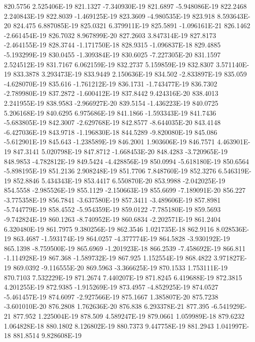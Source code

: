 820.5756  2.525406E-19
821.1327  -7.340930E-19
821.6897  -5.948086E-19
822.2468  2.240843E-19
822.8039  -1.469125E-19
823.3609  -4.980535E-19
823.918  8.593643E-20
824.475  6.887085E-19
825.0321  6.379911E-19
825.5891  -1.096161E-21
826.1462  -2.661454E-19
826.7032  8.967899E-20
827.2603  3.847314E-19
827.8173  -2.464155E-19
828.3744  -1.171750E-18
828.9315  -1.096837E-18
829.4885  -5.193299E-19
830.0455  -1.309384E-19
830.6025  -7.227305E-20
831.1597  2.524512E-19
831.7167  6.062159E-19
832.2737  5.159859E-19
832.8307  3.571140E-19
833.3878  3.293473E-19
833.9449  2.150636E-19
834.502  -2.833897E-19
835.059  -4.628070E-19
835.616  -1.761212E-19
836.1731  -1.743477E-19
836.7302  -2.789980E-19
837.2872  -1.600412E-19
837.8442  9.424316E-20
838.4013  2.241955E-19
838.9583  -2.966927E-20
839.5154  -1.436223E-19
840.0725  5.206168E-19
840.6295  6.975686E-19
841.1866  -1.593343E-19
841.7436  -5.683805E-19
842.3007  -2.629768E-19
842.8577  -8.644035E-20
843.4148  -6.427036E-19
843.9718  -1.196830E-18
844.5289  -9.820080E-19
845.086  -5.612901E-19
845.643  -1.238589E-19
846.2001  1.903606E-19
846.7571  4.463901E-19
847.3141  5.020798E-19
847.8712  -1.668453E-20
848.4283  -3.720965E-19
848.9853  -4.782812E-19
849.5424  -4.428856E-19
850.0994  -5.618180E-19
850.6564  -5.898195E-19
851.2136  2.908248E-19
851.7706  7.848760E-19
852.3276  6.546319E-19
852.8846  5.434343E-19
853.4417  6.550870E-20
853.9988  -2.042025E-19
854.5558  -2.985526E-19
855.1129  -2.150663E-19
855.6699  -7.189091E-20
856.227  -3.775358E-19
856.7841  -3.637580E-19
857.3411  -3.489606E-19
857.8981  -5.744779E-19
858.4552  -5.954359E-19
859.0122  -7.785180E-19
859.5693  -9.742824E-19
860.1263  -8.740952E-19
860.6834  -2.202571E-19
861.2404  6.320480E-19
861.7975  9.380256E-19
862.3546  1.021735E-18
862.9116  8.028536E-19
863.4687  -1.593174E-19
864.0257  -4.377774E-19
864.5828  -3.930192E-19
865.1398  -8.759500E-19
865.6969  -1.201923E-18
866.2539  -7.458692E-19
866.811  -1.114928E-19
867.368  -1.589732E-19
867.925  1.152554E-19
868.4822  3.971827E-19
869.0392  -9.116555E-20
869.5963  -3.366625E-19
870.1533  1.753111E-19
870.7103  7.532229E-19
871.2674  7.440207E-19
871.8245  6.419688E-19
872.3815  4.201255E-19
872.9385  -1.915269E-19
873.4957  -4.852925E-19
874.0527  -5.461457E-19
874.6097  -2.927566E-19
875.1667  1.385807E-20
875.7238  -3.601010E-20
876.2808  1.762636E-20
876.838  6.293378E-21
877.395  -6.541929E-21
877.952  1.225004E-19
878.509  4.589247E-19
879.0661  1.059989E-18
879.6232  1.064828E-18
880.1802  8.126802E-19
880.7373  9.447758E-19
881.2943  1.041997E-18
881.8514  9.828608E-19
